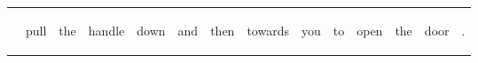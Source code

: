 \documentclass[landscape]{article}
\begin{document}
\noindent\begin{tabular}{|l|p{10pt}|p{10pt}|p{10pt}|p{10pt}|p{10pt}|p{10pt}|p{10pt}|p{10pt}|p{10pt}|p{10pt}|p{10pt}|p{10pt}|p{10pt}|}
\hline
&\begin{sideways}\cellcolor{ref0}pull\hspace{12pt}\end{sideways}&\begin{sideways}\cellcolor{ref1}the\hspace{12pt}\end{sideways}&\begin{sideways}\cellcolor{ref2}handle\hspace{12pt}\end{sideways}&\begin{sideways}\cellcolor{ref3}down\hspace{12pt}\end{sideways}&\begin{sideways}\cellcolor{ref4}and\hspace{12pt}\end{sideways}&\begin{sideways}\cellcolor{ref5}then\hspace{12pt}\end{sideways}&\begin{sideways}\cellcolor{ref6}towards\hspace{12pt}\end{sideways}&\begin{sideways}\cellcolor{ref7}you\hspace{12pt}\end{sideways}&\begin{sideways}\cellcolor{ref8}to\hspace{12pt}\end{sideways}&\begin{sideways}\cellcolor{ref9}open\hspace{12pt}\end{sideways}&\begin{sideways}\cellcolor{ref10}the\hspace{12pt}\end{sideways}&\begin{sideways}\cellcolor{ref11}door\hspace{12pt}\end{sideways}&\begin{sideways}\cellcolor{ref12}.\hspace{12pt}\end{sideways}\\

\end{tabular}
\end{document}
